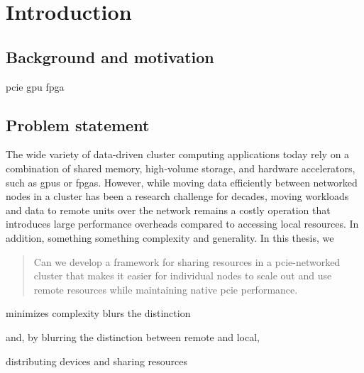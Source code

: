 \chapter{Introduction}\label{sec:intro}
\section{Background and motivation}
\gls{pcie}
\gls{gpu}
\gls{fpga}

\section{Problem statement}\label{sec:objectives}
The wide variety of data-driven cluster computing applications today rely on a combination of shared memory, high-volume storage, and hardware accelerators, such as \glspl{gpu} or \glspl{fpga}.
%
However, while moving data efficiently between networked nodes in a cluster has been a research challenge for decades, moving workloads and data to remote units over the network remains a costly operation that introduces large performance overheads compared to accessing local resources.
%
In addition, something something complexity and generality.
%
In this thesis, we
\begin{quote}
    Can we develop a framework for sharing resources in a \gls{pcie}-networked cluster that makes it easier for individual nodes to scale out and use remote resources while maintaining native \gls{pcie} performance.
\end{quote}


    
    
    minimizes complexity blurs the distinction 
    
     and,
    by blurring the distinction between remote and local, 
    
    distributing devices and sharing resources 
    

